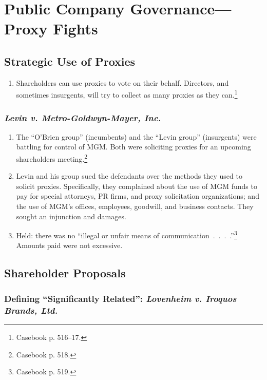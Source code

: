 \section{Public Company Governance---Proxy Fights}

\subsection{Strategic Use of Proxies}

\begin{enumerate}
    \item Shareholders can use proxies to vote on their behalf. Directors, and 
    sometimes insurgents, will try to collect as many proxies as they 
    can.\footnote{Casebook p. 516--17.}
\end{enumerate}

\subsubsection{\emph{Levin v. Metro-Goldwyn-Mayer, Inc.}}

\begin{enumerate}
    \item The ``O'Brien group'' (incumbents) and the ``Levin group'' 
    (insurgents) were battling for control of MGM. Both were soliciting proxies 
    for an upcoming shareholders meeting.\footnote{Casebook p. 518.}
    \item Levin and his group sued the defendants over the methods they used to 
    solicit proxies. Specifically, they complained about the use of MGM funds to 
    pay for special attorneys, PR firms, and proxy solicitation organizations; 
    and the use of MGM's offices, employees, goodwill, and business contacts. 
    They sought an injunction and damages.
    \item Held: there was no ``illegal or unfair means of 
    communication~.~.~.~.''\footnote{Casebook p. 519.} Amounts paid were not 
    excessive.
\end{enumerate}

\subsection{Shareholder Proposals}

\subsubsection{Defining ``Significantly Related'': \emph{Lovenheim v. Iroquos 
Brands, Ltd.}}

